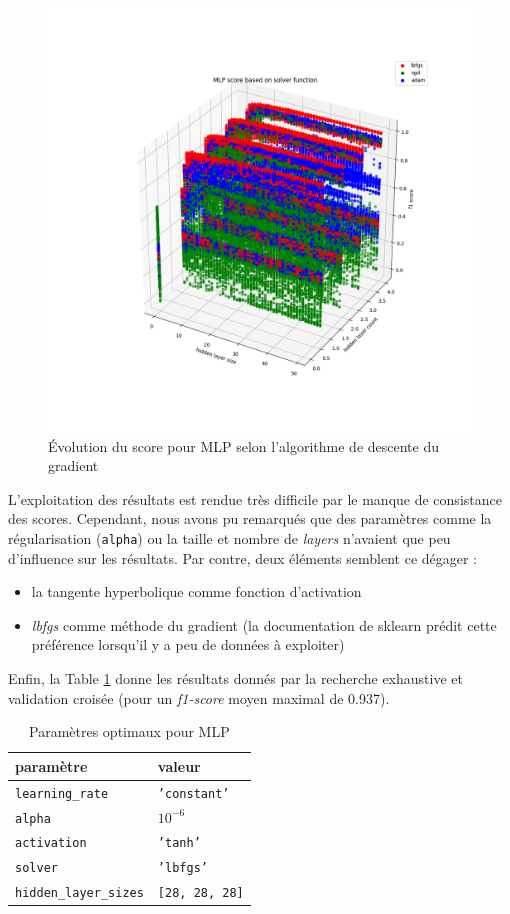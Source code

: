 \documentclass[a4paper]{report}
\begin{document}
\begin{figure}
\centering
\includegraphics[width=\textwidth]{img/mlp_solver.png}
\caption{Évolution du score pour MLP selon l'algorithme de descente du gradient\label{mlp_solver}}
\end{figure}

L'exploitation des résultats est rendue très difficile par le manque de consistance des scores. Cependant, nous avons pu remarqués que des paramètres comme la régularisation (\texttt{alpha}) ou la taille et nombre de \emph{layers} n'avaient que peu d'influence sur les résultats. Par contre, deux éléments semblent ce dégager : \begin{itemize}
\item la tangente hyperbolique comme fonction d'activation
\item \emph{lbfgs} comme méthode du gradient (la documentation de sklearn prédit cette préférence lorsqu'il y a peu de données à exploiter)
\end{itemize}
Enfin, la Table \ref{best_params_mlp} donne les résultats donnés par la recherche exhaustive et validation croisée (pour un \emph{f1-score} moyen maximal de 0.937).

\begin{table}
\centering
\begin{tabular}{ll}
paramètre & valeur \\
\hline
\texttt{learning\_rate} & \texttt{'constant'} \\
\texttt{alpha} & \texttt{$10^{-6}$} \\
\texttt{activation} & \texttt{'tanh'} \\
\texttt{solver} & \texttt{'lbfgs'} \\
\texttt{hidden\_layer\_sizes} & \texttt{[28, 28, 28]}\\
\end{tabular}
\caption{Paramètres optimaux pour MLP\label{best_params_mlp}}
\end{table}
\end{document}
